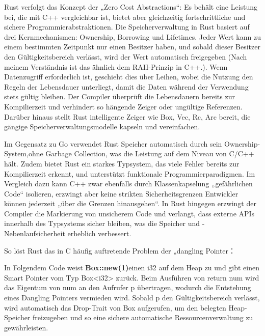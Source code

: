 Rust verfolgt das Konzept der „Zero Cost Abstractions“\autocite{TheRustProgrammingLanguage}: Es behält eine Leistung bei, 
die mit C++ vergleichbar ist, bietet aber gleichzeitig fortschrittliche und sichere 
Programmierabstraktionen. 
Die Speicherverwaltung in Rust basiert auf drei Kernmechanismen: Ownership, Borrowing 
und Lifetimes. Jeder Wert kann zu einem bestimmten Zeitpunkt nur einen Besitzer haben, 
und sobald dieser Besitzer den Gültigkeitsbereich verlässt, wird der Wert automatisch 
freigegeben (Nach meinem Verständnis ist das ähnlich dem RAII-Prinzip in C++.). Wenn Datenzugriff erforderlich ist, 
geschieht dies über Leihen, wobei die Nutzung den Regeln der Lebensdauer unterliegt, damit die Daten 
während der Verwendung stets gültig bleiben. Der Compiler überprüft die Lebensdauern bereits zur 
Kompilierzeit und verhindert so hängende Zeiger oder ungültige Referenzen\autocite{TheRustProgrammingLanguage}. Darüber hinaus stellt Rust 
intelligente Zeiger wie Box, Vec, Rc, Arc bereit, die gängige Speicherverwaltungsmodelle 
kapseln und vereinfachen.

Im Gegensatz zu Go verwendet Rust Speicher automatisch durch sein Ownership-System,ohne Garbage Collection\autocite{TheRustProgrammingLanguage}, was die Leistung auf dem Niveau von C/C++ 
hält. Zudem bietet Rust ein starkes Typsystem, das viele Fehler bereits zur Kompilierzeit erkennt, 
und unterstützt funktionale Programmierparadigmen. Im Vergleich dazu kann C++ zwar ebenfalls durch 
Klassenkapselung „gefährlichen Code“ isolieren, erzwingt aber keine strikten Sicherheitsgrenzen Entwickler 
können jederzeit „über die Grenzen hinausgehen“. In Rust hingegen erzwingt der Compiler 
die Markierung von unsicherem Code und verlangt, dass externe APIs innerhalb des Typsystems sicher bleiben, 
was die Speicher und -Nebenlaufsicherheit erheblich verbessert.

So löst Rust das in C häufig auftretende Problem der „dangling Pointer：

\begin{figure}[htp]
    \centering
    
    \label{fig:dangling_pointer_in_Rust}
\end{figure}

In Folgendem Code weist \textbf{Box::new(1)}einen i32 auf dem Heap zu und gibt einen Smart 
Pointer vom Typ Box<i32> zurück. Beim Ausführen von return num wird das Eigentum 
von num an den Aufrufer p übertragen, wodurch die Entstehung eines Dangling Pointers 
vermieden wird. Sobald p den Gültigkeitsbereich verlässt, wird automatisch das 
Drop-Trait von Box aufgerufen, um den belegten Heap-Speicher freizugeben und so 
eine sichere automatische Ressourcenverwaltung zu gewährleisten.

